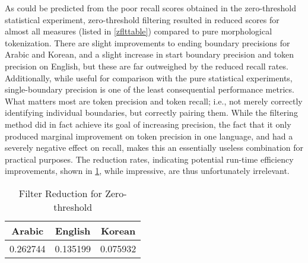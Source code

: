 As could be predicted from the poor recall scores obtained in the zero-threshold statistical experiment, zero-threshold filtering resulted in reduced scores for almost all measures (listed in \ref{zflttable}) compared to pure morphological tokenization. There are slight improvements to ending boundary precisions for Arabic and Korean, and a slight increase in start boundary precision and token precision on English, but these are far outweighed by the reduced recall rates. Additionally, while useful for comparison with the pure statistical experiments, single-boundary precision is one of the least consequential performance metrics. What matters most are token precision and token recall; i.e., not merely correctly identifying individual boundaries, but correctly pairing them. While the filtering method did in fact achieve its goal of increasing precision, the fact that it only produced marginal improvement on token precision in one language, and had a severely negative effect on recall, makes this an essentially useless combination for practical purposes. The reduction rates, indicating potential run-time efficiency improvements, shown in \ref{zredtable}, while impressive, are thus unfortunately irrelevant.

\begin{table}
	\centering
	\begin{tabular}{| c | c | c |}
		\hline
		Arabic & English & Korean \\ \hline
		0.262744 & 0.135199 & 0.075932 \\ \hline
	\end{tabular}
	\caption{Filter Reduction for Zero-threshold}
	\label{zredtable}
\end{table}

